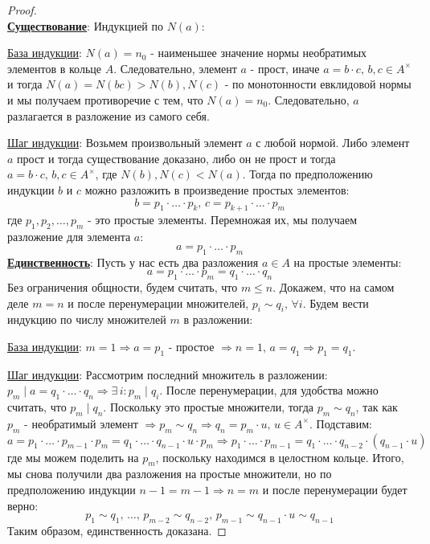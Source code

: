 \documentclass[12pt]{article}
\theoremstyle{definition}
\begin{document}
\begin{proof}
	\hfill\\
	\textbf{\uline{Существование}}: Индукцией по $N(a)$:
	
	\uline{База индукции}: $N(a) = n_0$ - наименьшее значение нормы необратимых элементов в кольце $A$. Следовательно, элемент $a$ - прост, иначе $a = b{\cdot}c, \, b,c \in A^\times$ и тогда $N(a) = N(bc) > N(b),N(c)$ - по монотонности евклидовой нормы и мы получаем противоречие с тем, что $N(a) = n_0$. Следовательно, $a$ разлагается в разложение из самого себя.
	
	\uline{Шаг индукции}: Возьмем произвольный элемент $a$ с любой нормой. Либо элемент $a$ прост и тогда существование доказано, либо он не прост и тогда $a = b{\cdot}c, \, b,c \in A^{\times}$, где $N(b),N(c) < N(a)$. Тогда по предположению индукции $b$ и $c$ можно разложить в произведение простых элементов:
	$$
		b = p_1{\cdot}\dotsc{\cdot}p_k, \, c = p_{k+1}{\cdot}\dotsc{\cdot}p_m
	$$
	где $p_1, p_2, \dotsc, p_m$ - это простые элементы. Перемножая их, мы получаем разложение для элемента $a$:
	$$
		a = p_1{\cdot}\dotsc{\cdot}p_m
	$$
	\textbf{\uline{Единственность}}: Пусть у нас есть два разложения $a \in A$ на простые элементы:
	$$
		a = p_1{\cdot}\dotsc{\cdot}p_m = q_1{\cdot}\dotsc{\cdot}q_n
	$$
	Без ограничения общности, будем считать, что $m \leq n$. Докажем, что на самом деле $m = n$ и после  перенумерации множителей, $p_i \sim q_i, \, \forall i$. Будем вести индукцию по числу множителей $m$ в разложении:
	
	\uline{База индукции}: $m = 1 \Rightarrow a = p_1$ - простое $\Rightarrow n =1, \, a = q_1 \Rightarrow p_1 = q_1$.
	
	\uline{Шаг индукции}: Рассмотрим последний множитель в разложении: $p_m \mid a = q_1{\cdot}\dotsc{\cdot}q_n \Rightarrow \exists \, i \colon p_m \mid q_i$. После перенумерации, для удобства можно считать, что $p_m \mid q_n$. Поскольку это простые множители, тогда $p_m \sim q_n$, так как $p_m$ - необратимый элемент $\Rightarrow p_m \sim q_n \Rightarrow q_n = p_m{\cdot}u, \, u \in A^{\times}$. Подставим:
	$$
		a = p_1{\cdot}\dotsc{\cdot}p_{m-1}{\cdot}p_m = q_1{\cdot}\dotsc{\cdot}q_{n-1}{\cdot}u{\cdot}p_m \Rightarrow p_1{\cdot}\dotsc{\cdot}p_{m-1} = q_1{\cdot}\dotsc{\cdot}q_{n-2}{\cdot}(q_{n-1}{\cdot}u)
	$$
	где мы можем поделить на $p_m$, поскольку находимся в целостном кольце. Итого, мы снова получили два разложения на простые множители, но по предположению индукции $n-1 = m - 1 \Rightarrow n = m$ и после перенумерации будет верно:
	$$
		p_1 \sim q_1, \, \dotsc, \, p_{m-2} \sim q_{n-2},\, p_{m-1} \sim q_{n-1}{\cdot}u \sim q_{n-1}
	$$
	Таким образом, единственность доказана.
\end{proof}
\end{document}
